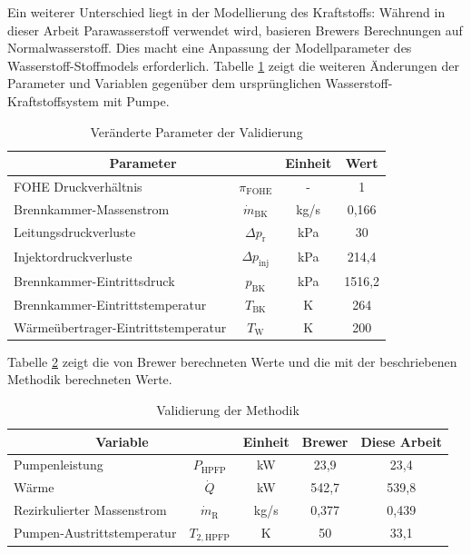 Ein weiterer Unterschied liegt in der Modellierung des Kraftstoffs: Während in dieser Arbeit Parawasserstoff verwendet wird, basieren Brewers Berechnungen auf Normalwasserstoff. Dies macht eine Anpassung der Modellparameter des Wasserstoff-Stoffmodels erforderlich. Tabelle \ref{Tab:brewer} zeigt die weiteren Änderungen der Parameter und Variablen gegenüber dem ursprünglichen Wasserstoff-Kraftstoffsystem mit Pumpe.

\begin{table}[ht]
    \centering
	\caption{Veränderte Parameter der Validierung}
	\begin{tabular} {|l|c|c|c|} \hline%
    \multicolumn{2}{|c|}{Parameter} & Einheit & Wert\\ \hline\hline%
    FOHE Druckverhältnis & $\pi_\mathrm{FOHE}$ & - & 1 \\ \hline
    Brennkammer-Massenstrom & $\dot{m}_\mathrm{BK}$ & kg/s & 0,166 \\ \hline
    Leitungsdruckverluste & $\Delta p_\mathrm{r}$ & kPa & 30 \\ \hline
    Injektordruckverluste & $\Delta p_\mathrm{inj}$ & kPa & 214,4 \\ \hline
    Brennkammer-Eintrittsdruck & $p_\mathrm{BK}$ & kPa & 1516,2 \\ \hline
    Brennkammer-Eintrittstemperatur & $T_\mathrm{BK}$ & K & 264 \\ \hline
    Wärmeübertrager-Eintrittstemperatur & $T_\mathrm{W}$ & K & 200 \\ \hline
    \end{tabular}	
    \label{Tab:brewer}%
\end{table}
\FloatBarrier 

Tabelle \ref{Tab:validation} zeigt die von Brewer berechneten Werte und die mit der beschriebenen Methodik berechneten Werte. 

\begin{table}[ht]
    \centering
	\caption{Validierung der Methodik}
	\begin{tabular} {|l|c|c|c|c|} \hline%
    \multicolumn{2}{|c|}{Variable} & Einheit & Brewer \cite{Brewer.1991} & Diese Arbeit \\ \hline\hline%
    Pumpenleistung & $P_\mathrm{HPFP}$ & kW & 23,9 & 23,4 \\ \hline
    Wärme & $\dot{Q}$ & kW & 542,7 & 539,8 \\ \hline
    Rezirkulierter Massenstrom & $\dot{m}_\mathrm{R}$ & kg/s & 0,377 & 0,439 \\ \hline
    Pumpen-Austrittstemperatur & $T_{2,\mathrm{HPFP}}$ & K & 50 & 33,1 \\ \hline
    \end{tabular}	
    \label{Tab:validation}%
\end{table}
\FloatBarrier 

